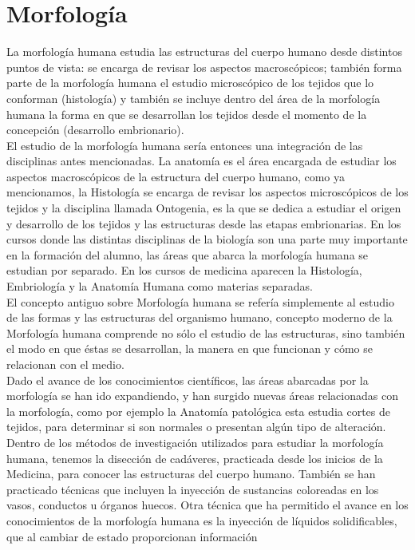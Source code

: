 \section{Morfología}
La morfología humana estudia las estructuras del cuerpo humano desde distintos 
puntos de vista: se encarga de revisar los aspectos macroscópicos; 
también forma parte de la morfología humana el estudio microscópico
de los tejidos que lo conforman (histología) y también se incluye dentro del 
área de la morfología humana la forma en que se 
desarrollan los tejidos desde el momento de la concepción (desarrollo embrionario).\\
El estudio de la morfología humana sería entonces una integración de 
las disciplinas antes mencionadas. La anatomía es el área encargada de estudiar los 
aspectos macroscópicos de la estructura del cuerpo humano, como ya mencionamos,
la Histología se encarga de revisar los aspectos microscópicos de los tejidos 
y la disciplina llamada Ontogenia, es la que se dedica a estudiar el origen 
y desarrollo de los tejidos y las estructuras desde las etapas embrionarias.
En los cursos donde las distintas disciplinas de la biología son una parte muy importante en la formación del alumno, las áreas que abarca la morfología 
humana se estudian por separado. En los cursos de medicina aparecen la Histología, Embriología y la Anatomía Humana como materias separadas.\\
El concepto antiguo sobre Morfología humana se refería simplemente al estudio de las formas y  las estructuras del organismo humano, 
concepto moderno de la Morfología humana comprende no sólo el estudio de las estructuras, sino también el modo en que éstas se desarrollan, 
la manera en que funcionan y cómo se relacionan con el medio.\\
Dado el avance de los conocimientos científicos, las áreas abarcadas por la morfología se han ido expandiendo, y han surgido nuevas áreas relacionadas con la morfología, 
como por ejemplo la Anatomía patológica esta estudia cortes de tejidos, para determinar  si son normales o presentan algún tipo de alteración.\\
Dentro de los métodos de investigación utilizados para estudiar la morfología humana, tenemos la disección de cadáveres, practicada desde los inicios de la Medicina, 
para conocer las estructuras del cuerpo humano. También se han practicado técnicas que incluyen la inyección de sustancias coloreadas en los vasos, conductos u órganos huecos. 
Otra técnica que ha permitido el avance en los conocimientos de la morfología humana es la inyección de líquidos solidificables, que al cambiar de estado proporcionan información 
